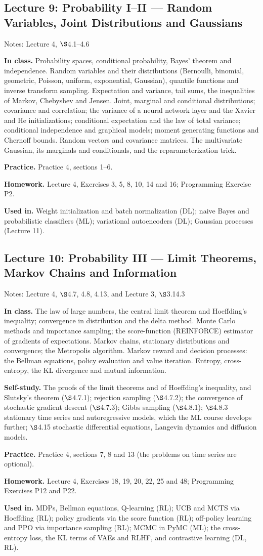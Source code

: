 \documentclass[11pt]{article}
\newcommand{\lecture}[3]{\subsection*{Lecture #1: #2}\textcolor{black!60}{Notes: #3}\par}
\newcommand{\block}[1]{\par\smallskip\textbf{#1}\quad}
\begin{document}
\lecture{9}{Probability I--II --- Random Variables, Joint Distributions and Gaussians}{Lecture 4, $\S$4.1--4.6}
\block{In class.} Probability spaces, conditional probability, Bayes' theorem and independence. Random variables and their distributions (Bernoulli, binomial, geometric, Poisson, uniform, exponential, Gaussian), quantile functions and inverse transform sampling. Expectation and variance, tail sums, the inequalities of Markov, Chebyshev and Jensen. Joint, marginal and conditional distributions; covariance and correlation; the variance of a neural network layer and the Xavier and He initializations; conditional expectation and the law of total variance; conditional independence and graphical models; moment generating functions and Chernoff bounds. Random vectors and covariance matrices. The multivariate Gaussian, its marginals and conditionals, and the reparameterization trick.
\block{Practice.} Practice 4, sections 1--6.
\block{Homework.} Lecture 4, Exercises 3, 5, 8, 10, 14 and 16; Programming Exercise P2.
\block{Used in.} Weight initialization and batch normalization (DL); naive Bayes and probabilistic classifiers (ML); variational autoencoders (DL); Gaussian processes (Lecture 11).

\lecture{10}{Probability III --- Limit Theorems, Markov Chains and Information}{Lecture 4, $\S$4.7, 4.8, 4.13, and Lecture 3, $\S$3.14.3}
\block{In class.} The law of large numbers, the central limit theorem and Hoeffding's inequality; convergence in distribution and the delta method. Monte Carlo methods and importance sampling; the score-function (REINFORCE) estimator of gradients of expectations. Markov chains, stationary distributions and convergence; the Metropolis algorithm. Markov reward and decision processes: the Bellman equations, policy evaluation and value iteration. Entropy, cross-entropy, the KL divergence and mutual information.
\block{Self-study.} The proofs of the limit theorems and of Hoeffding's inequality, and Slutsky's theorem ($\S$4.7.1); rejection sampling ($\S$4.7.2); the convergence of stochastic gradient descent ($\S$4.7.3); Gibbs sampling ($\S$4.8.1); $\S$4.8.3 stationary time series and autoregressive models, which the ML course develops further; $\S$4.15 stochastic differential equations, Langevin dynamics and diffusion models.
\block{Practice.} Practice 4, sections 7, 8 and 13 (the problems on time series are optional).
\block{Homework.} Lecture 4, Exercises 18, 19, 20, 22, 25 and 48; Programming Exercises P12 and P22.
\block{Used in.} MDPs, Bellman equations, Q-learning (RL); UCB and MCTS via Hoeffding (RL); policy gradients via the score function (RL); off-policy learning and PPO via importance sampling (RL); MCMC in PyMC (ML); the cross-entropy loss, the KL terms of VAEs and RLHF, and contrastive learning (DL, RL).
\end{document}
